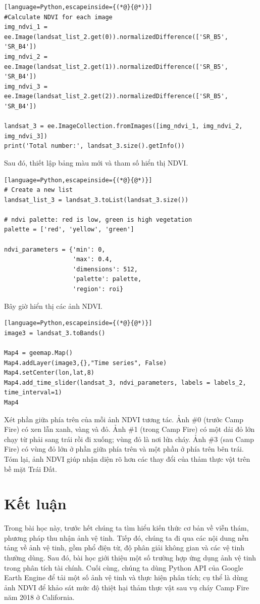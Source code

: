 \begin{lstlisting}[language=Python,escapeinside={(*@}{@*)}]
#Calculate NDVI for each image
img_ndvi_1 = ee.Image(landsat_list_2.get(0)).normalizedDifference(['SR_B5', 'SR_B4'])
img_ndvi_2 = ee.Image(landsat_list_2.get(1)).normalizedDifference(['SR_B5', 'SR_B4'])
img_ndvi_3 = ee.Image(landsat_list_2.get(2)).normalizedDifference(['SR_B5', 'SR_B4'])

landsat_3 = ee.ImageCollection.fromImages([img_ndvi_1, img_ndvi_2, img_ndvi_3])
print('Total number:', landsat_3.size().getInfo())
\end{lstlisting}

Sau đó, thiết lập bảng màu mới và tham số hiển thị NDVI.

\begin{lstlisting}[language=Python,escapeinside={(*@}{@*)}]
# Create a new list
landsat_list_3 = landsat_3.toList(landsat_3.size())

# ndvi palette: red is low, green is high vegetation
palette = ['red', 'yellow', 'green']

ndvi_parameters = {'min': 0,
                   'max': 0.4,
                   'dimensions': 512,
                   'palette': palette,
                   'region': roi}
\end{lstlisting}

Bây giờ hiển thị các ảnh NDVI.

\begin{lstlisting}[language=Python,escapeinside={(*@}{@*)}]
image3 = landsat_3.toBands()

Map4 = geemap.Map()
Map4.addLayer(image3,{},"Time series", False)
Map4.setCenter(lon,lat,8)
Map4.add_time_slider(landsat_3, ndvi_parameters, labels = labels_2, time_interval=1)
Map4
\end{lstlisting}

Xét phần giữa phía trên của mỗi ảnh NDVI tương tác. Ảnh \#0 (trước Camp Fire) có xen lẫn xanh, vàng và đỏ. Ảnh \#1 (trong Camp Fire) có một dải đỏ lớn chạy từ phải sang trái rồi đi xuống; vùng đỏ là nơi lửa cháy. Ảnh \#3 (sau Camp Fire) có vùng đỏ lớn ở phần giữa phía trên và một phần ở phía trên bên trái. Tóm lại, ảnh NDVI giúp nhận diện rõ hơn các thay đổi của thảm thực vật trên bề mặt Trái Đất.

\section{Kết luận}

Trong bài học này, trước hết chúng ta tìm hiểu kiến thức cơ bản về viễn thám, phương pháp thu nhận ảnh vệ tinh. Tiếp đó, chúng ta đi qua các nội dung nền tảng về ảnh vệ tinh, gồm phổ điện từ, độ phân giải không gian và các vệ tinh thường dùng. Sau đó, bài học giới thiệu một số trường hợp ứng dụng ảnh vệ tinh trong phân tích tài chính. Cuối cùng, chúng ta dùng Python API của Google Earth Engine để tải một số ảnh vệ tinh và thực hiện phân tích; cụ thể là dùng ảnh NDVI để khảo sát mức độ thiệt hại thảm thực vật sau vụ cháy Camp Fire năm 2018 ở California.
